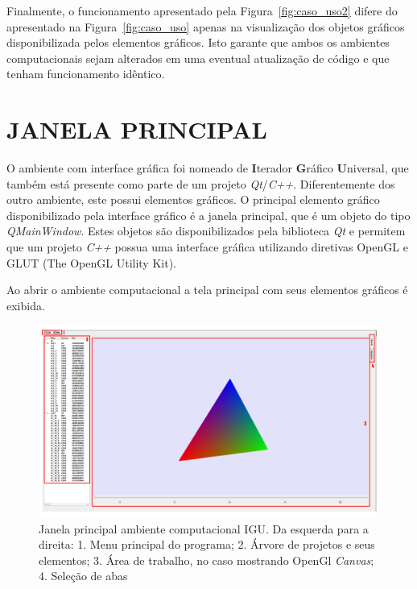 \documentclass[a4paper,12pt]{monografia}
\theoremstyle{plain}
\theoremstyle{definition}
\theoremstyle{remark}
\begin{document}
Finalmente, o funcionamento apresentado pela Figura~\ref{fig:caso_uso2} difere do apresentado na Figura~\ref{fig:caso_uso} apenas na visualização dos objetos gráficos disponibilizada pelos elementos gráficos. Isto garante que ambos os ambientes computacionais sejam alterados em uma eventual atualização de código e que tenham funcionamento idêntico.

\section{JANELA PRINCIPAL}\label{sec:janela}

O ambiente com interface gráfica foi nomeado de \textbf{I}terador \textbf{G}ráfico \textbf{U}niversal, que também está presente como parte de um projeto \textit{Qt}/\textit{C++}. Diferentemente dos outro ambiente, este possui elementos gráficos. O principal elemento gráfico disponibilizado pela interface gráfico é a janela principal, que é um objeto do tipo \textit{QMainWindow}. Estes objetos são disponibilizados pela biblioteca \textit{Qt} e permitem que um projeto \textit{C++} possua uma interface gráfica utilizando diretivas OpenGL e GLUT (The OpenGL Utility Kit).

Ao abrir o ambiente computacional a tela principal com seus elementos gráficos é exibida.

\begin{figure}[!htbp]
	\centering
	\includegraphics[width=\linewidth]{Figures/IGU_001a.png}
	\caption{Janela principal ambiente computacional IGU. Da esquerda para a direita: 1. Menu principal do programa; 2. Árvore de projetos e seus elementos; 3. Área de trabalho, no caso mostrando OpenGl \textit{Canvas}; 4. Seleção de abas}
	\label{fig:UI}
\end{figure}
\end{document}

